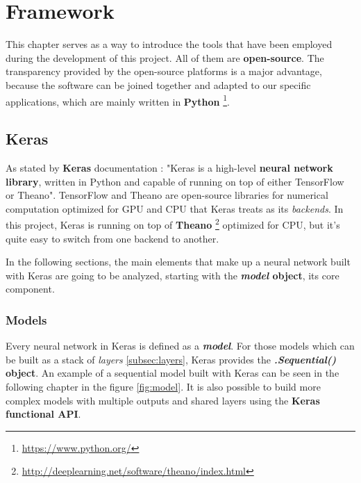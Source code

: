 \chapter{Framework}\label{ch:framework}
This chapter serves as a way to introduce the tools that have been employed during the development of this project. All of them are \textbf{open-source}. The transparency provided by the open-source platforms is a major advantage, because the software can be joined together and adapted to our specific applications, which are mainly written in \textbf{Python} \footnote{\url{https://www.python.org/}}.

\section{Keras}\label{sec:keras}
As stated by \textbf{Keras} documentation \cite{chollet2015keras}: "Keras is a high-level \textbf{neural network library}, written in Python and capable of running on top of either TensorFlow or Theano". TensorFlow and Theano are open-source libraries for numerical computation optimized for GPU and CPU that Keras treats as its \textit{backends}. In this project, Keras is running on top of \textbf{Theano} \footnote{\url{http://deeplearning.net/software/theano/index.html}} optimized for CPU, but it's quite easy to switch from one backend to another.

In the following sections, the main elements that make up a neural network built with Keras are going to be analyzed, starting with the \textbf{\textit{model} object}, its core component.

\subsection{Models}\label{subsec:models}
Every neural network in Keras is defined as a \textbf{\textit{model}}. For those models which can be built as a stack of \textit{layers} \ref{subsec:layers}, Keras provides the \textbf{\textit{.Sequential()} object}. An example of a sequential model built with Keras can be seen in the following chapter in the figure \ref{fig:model}. It is also possible to build more complex models with multiple outputs and shared layers using the \textbf{Keras functional API}.

